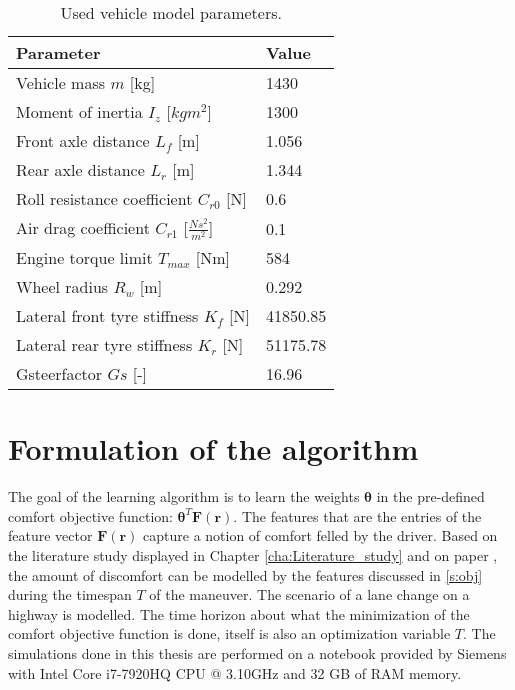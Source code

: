 \begin{table}[h]
	\centering
	\begin{tabular}{|p{5cm}|p{2cm}|}
		\hline
		\textbf{Parameter} & \textbf{Value}\\ \hline		
		Vehicle mass $m$ [kg] & 1430\\ \hline
		Moment of inertia $I_z$ [$kgm^2$] & 1300\\ \hline
		Front axle distance $L_f$ [m] & 1.056\\ \hline
		Rear axle distance $L_r$ [m] & 1.344\\ \hline
		Roll resistance coefficient $C_{r0}$ [N] & 0.6\\ \hline
		Air drag coefficient $C_{r1}$ [$\frac{Ns^2}{m^2}$] & 0.1\\ \hline
		Engine torque limit $T_{max}$ [Nm] & 584\\ \hline
		Wheel radius $R_w$ [m] & 0.292\\ \hline
		Lateral front tyre stiffness $K_{f}$ [N] & 41850.85\\ \hline
		Lateral rear tyre stiffness $K_{r}$ [N] & 51175.78\\ \hline
		Gsteerfactor $Gs$ [-] &16.96 \\ \hline
		
	\end{tabular}
	\caption{Used vehicle model parameters.}
	\label{table:vehicel_model_param}
\end{table}
\newpage
\section{Formulation of the algorithm} 
\label{s:learning_alg}
The goal of the learning algorithm is to learn the weights $\bm{\theta}$ in the pre-defined comfort objective function: $\bm{\theta}^T\bm{F}(\bm{r})$. The features that are the entries of the feature vector $\bm{F}(\bm{r})$ capture a notion of comfort felled by the driver. Based on the literature study displayed in Chapter \ref{cha:Literature_study} and on paper \cite{Kuderer2015a}, the amount of discomfort can be modelled by the features discussed in \ref{s:obj} during the timespan $T$ of the maneuver. The scenario of a lane change on a highway is modelled. The time horizon about what the minimization of the comfort objective function is done, itself is also an optimization variable  $T$. The simulations done in this thesis are performed on a notebook provided by Siemens with Intel Core i7-7920HQ CPU @ 3.10GHz and 32 GB of RAM memory.\\


